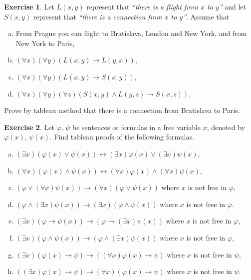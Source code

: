 \documentclass[11pt,a4paper]{amsart}
\theoremstyle{definition}
\newtheorem{problem}{Exercise}
\theoremstyle{remark}
\begin{document}
\begin{problem} Let $L(x,y)$ represent that \emph{``there is a flight from $x$ to $y$''} and let $S(x,y)$ represent that \emph{``there is a connection from $x$ to $y$''}. Assume that
\begin{enumerate}[(a)]
\itemsep6pt
\item From Prague you can flight to Bratislava, London and New York, and from New York to Paris,
\item $(\forall x)(\forall y)(L(x,y) \to L(y,x))$,
\item $(\forall x)(\forall y)(L(x,y)\to S(x,y))$,
\item $(\forall x)(\forall y)(\forall z)(S(x,y)\wedge L(y,z)\to S(x,z))$.
\end{enumerate}
Prove by tableau method that there is a connection from Bratislava to Paris.
\end{problem} 

\smallskip

\begin{problem} Let $\varphi$, $\psi$ be sentences or formulas in a free variable $x$, denoted by $\varphi(x)$, $\psi(x)$. Find tableau proofs of the following formulas.
\begin{enumerate}[(a)]
\itemsep6pt
\item $(\exists x)(\varphi(x)\vee \psi(x))\leftrightarrow (\exists x)\varphi(x)\vee (\exists x)\psi(x)$,
\item $(\forall x)(\varphi(x)\wedge\psi(x))\leftrightarrow (\forall x)\varphi(x)\wedge(\forall x)\psi(x)$,
\item $(\varphi \vee (\forall x)\psi(x))\to (\forall x)(\varphi \vee \psi(x))$ where $x$ is not free in $\varphi$,
\item $(\varphi \wedge (\exists x)\psi(x))\to (\exists x)(\varphi \wedge \psi(x))$ where $x$ is not free in $\varphi$.
\item $(\exists x)(\varphi \to \psi(x))\to(\varphi \to (\exists x)\psi(x))$ where $x$ is not free in $\varphi$,
\item $(\exists x)(\varphi \wedge \psi(x))\to(\varphi \wedge (\exists x)\psi(x))$ where $x$ is not free in $\varphi$,
\item $(\exists x)(\varphi(x)\to\psi)\to((\forall x)\varphi(x)\to \psi)$ where $x$ is not free in $\psi$,
\item $((\exists x)\varphi(x)\to\psi)\to(\forall x)(\varphi(x)\to \psi)$ where $x$ is not free in $\psi$.
\end{enumerate}
\end{problem} 
\end{document}
